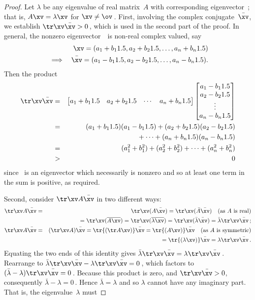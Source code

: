 \begin{proof} 
Let \(\lambda\) be any eigenvalue of real matrix~\(A\) with corresponding eigenvector~\xv; that is, \(A\xv=\lambda\xv\) for \(\xv\neq\ov\)\,.
First, involving the complex conjugate~\(\bar\xv\), we establish \(\tr\xv\bar\xv>0\)\,, which is used in the second part of the proof. 
In general, the nonzero eigenvector~\xv\ is non-real complex valued, say 
\begin{eqnarray*}
&&\xv=(a_1+b_1\i,a_2+b_2\i,\ldots,a_n+b_n\i)
\\&\implies&\bar\xv=(a_1-b_1\i,a_2-b_2\i,\ldots,a_n-b_n\i).
\end{eqnarray*}
Then the product
\begin{eqnarray*}
\tr\xv\bar\xv&=&
\begin{bmatrix} a_1+b_1\i&a_2+b_2\i&\cdots&a_n+b_n\i \end{bmatrix}
\begin{bmatrix} a_1-b_1\i\\a_2-b_2\i\\\vdots\\a_n-b_n\i \end{bmatrix}
\\&=&(a_1+b_1\i)(a_1-b_1\i)+(a_2+b_2\i)(a_2-b_2\i)
\\&&{}+\cdots+(a_n+b_n\i)(a_n-b_n\i)
\\&=&(a_1^2+b_1^2)+(a_2^2+b_2^2)+\cdots+(a_n^2+b_n^2)
\\&>&0
\end{eqnarray*}
since \xv~is an eigenvector which necessarily is nonzero and so at least one term in the sum is positive, as required.

Second, consider \(\tr\xv A\bar\xv\) in two different ways:
\begin{eqnarray*}
\tr\xv A\bar\xv&=&\tr\xv(A\bar\xv)
=\tr\xv(\bar A\bar\xv)\quad\text{(as \(A\) is real)}
\\&&{}=\tr\xv(\overline{ A\xv})
=\tr\xv(\overline{ \lambda\xv})
=\tr\xv(\bar\lambda\bar\xv)
=\bar\lambda\tr\xv\bar\xv\,;
\\\tr\xv A\bar\xv&=&(\tr\xv A)\bar\xv
=\tr{(\tr A\xv)}\bar\xv
=\tr{(A\xv)}\bar\xv
\quad\text{(as \(A\) is symmetric)}
\\&&{}=\tr{(\lambda\xv)}\bar\xv
=\lambda\tr\xv\bar\xv\,.
\end{eqnarray*}
Equating the two ends of this identity gives 
\(\bar\lambda\tr\xv\bar\xv=\lambda\tr\xv\bar\xv\)\,.
Rearrange to \(\bar\lambda\tr\xv\bar\xv-\lambda\tr\xv\bar\xv=0\)\,, 
which factors to \((\bar\lambda-\lambda)\tr\xv\bar\xv=0\)\,.
Because this product is zero, and \(\tr\xv\bar\xv>0\), consequently \(\bar\lambda-\lambda=0\)\,.
Hence \(\bar\lambda=\lambda\) and so \(\lambda\) cannot have any imaginary part.
That is, the eigenvalue~\(\lambda\) must 
\end{proof}


